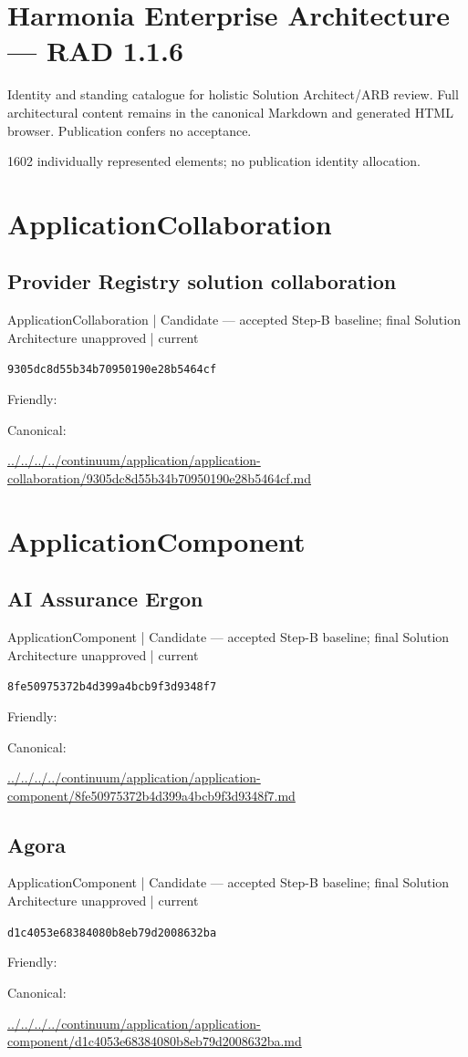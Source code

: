 \documentclass[10pt,a4paper]{article}
\begin{document}
\section*{Harmonia Enterprise Architecture — RAD 1.1.6}
Identity and standing catalogue for holistic Solution Architect/ARB review. Full architectural content remains in the canonical Markdown and generated HTML browser. Publication confers no acceptance.\par
1602 individually represented elements; no publication identity allocation.\par
\section*{ApplicationCollaboration}
\subsection*{Provider Registry solution collaboration}
{\small ApplicationCollaboration | Candidate — accepted Step-B baseline; final Solution Architecture unapproved | current}\par
\texttt{9305dc8d55b34b70950190e28b5464cf}\par
Friendly: \par
Canonical: \par
{\footnotesize\url{../../../../continuum/application/application-collaboration/9305dc8d55b34b70950190e28b5464cf.md}}\par
\section*{ApplicationComponent}
\subsection*{AI Assurance Ergon}
{\small ApplicationComponent | Candidate — accepted Step-B baseline; final Solution Architecture unapproved | current}\par
\texttt{8fe50975372b4d399a4bcb9f3d9348f7}\par
Friendly: \par
Canonical: \par
{\footnotesize\url{../../../../continuum/application/application-component/8fe50975372b4d399a4bcb9f3d9348f7.md}}\par
\subsection*{Agora}
{\small ApplicationComponent | Candidate — accepted Step-B baseline; final Solution Architecture unapproved | current}\par
\texttt{d1c4053e68384080b8eb79d2008632ba}\par
Friendly: \par
Canonical: \par
{\footnotesize\url{../../../../continuum/application/application-component/d1c4053e68384080b8eb79d2008632ba.md}}\par
\end{document}
